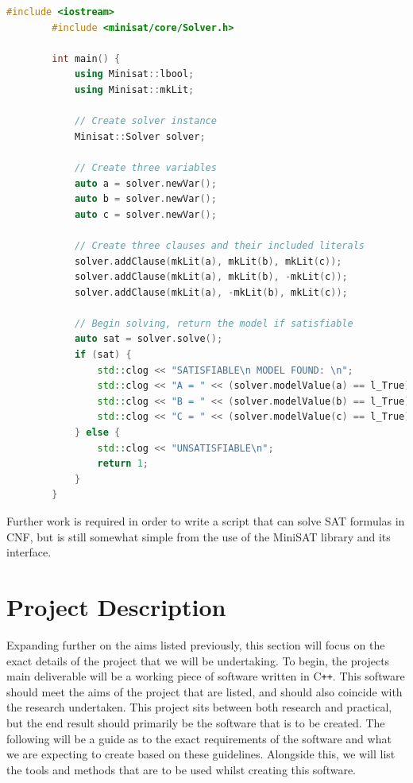 \documentclass{article}
\begin{document}
    \begin{lstlisting}[language=C++]
        #include <iostream>
        #include <minisat/core/Solver.h>

        int main() {
            using Minisat::lbool;
            using Minisat::mkLit;

            // Create solver instance
            Minisat::Solver solver;

            // Create three variables
            auto a = solver.newVar();
            auto b = solver.newVar();
            auto c = solver.newVar();

            // Create three clauses and their included literals
            solver.addClause(mkLit(a), mkLit(b), mkLit(c));
            solver.addClause(mkLit(a), mkLit(b), -mkLit(c));
            solver.addClause(mkLit(a), -mkLit(b), mkLit(c));

            // Begin solving, return the model if satisfiable
            auto sat = solver.solve();
            if (sat) {
                std::clog << "SATISFIABLE\n MODEL FOUND: \n";
                std::clog << "A = " << (solver.modelValue(a) == l_True) << '\n';
                std::clog << "B = " << (solver.modelValue(b) == l_True) << '\n';
                std::clog << "C = " << (solver.modelValue(c) == l_True) << '\n';
            } else {
                std::clog << "UNSATISFIABLE\n";
                return 1;
            }
        }
    \end{lstlisting}

    Further work is required in order to write a script that can solve SAT formulas in CNF, but is still somewhat simple from the use of the
    MiniSAT library and its interface.

\newpage
\section{Project Description}
Expanding further on the aims listed previously, this section will focus on the exact details of the project that we will be undertaking. To
begin, the projects main deliverable will be a working piece of software written in C\texttt{++}. This software should meet the aims of the
project that are listed, and should also coincide with the research undertaken. This project sits between both research and practical, but
the end result should primarily be the software that is to be created. The following will be a guide as to the exact requirements of the
software and what we are expecting to create based on these guidelines. Alongside this, we will list the tools and methods that are to be
used whilst creating this software.
\end{document}
